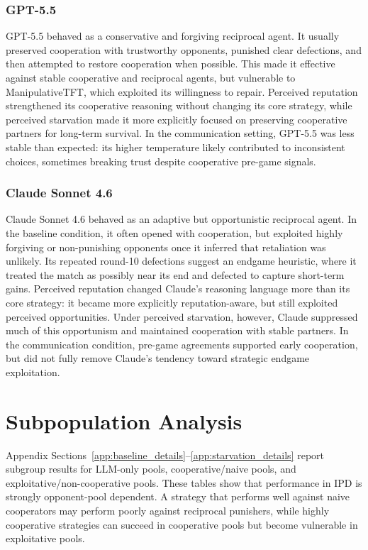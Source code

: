 \documentclass[11pt]{article}
\begin{document}
\subsubsection{GPT-5.5}

GPT-5.5 behaved as a conservative and forgiving reciprocal agent. It usually preserved cooperation with trustworthy opponents, punished clear defections, and then attempted to restore cooperation when possible. This made it effective against stable cooperative and reciprocal agents, but vulnerable to ManipulativeTFT, which exploited its willingness to repair. Perceived reputation strengthened its cooperative reasoning without changing its core strategy, while perceived starvation made it more explicitly focused on preserving cooperative partners for long-term survival. In the communication setting, GPT-5.5 was less stable than expected: its higher temperature likely contributed to inconsistent choices, sometimes breaking trust despite cooperative pre-game signals.

\subsubsection{Claude Sonnet 4.6}

Claude Sonnet 4.6 behaved as an adaptive but opportunistic reciprocal agent. In the baseline condition, it often opened with cooperation, but exploited highly forgiving or non-punishing opponents once it inferred that retaliation was unlikely. Its repeated round-10 defections suggest an endgame heuristic, where it treated the match as possibly near its end and defected to capture short-term gains. Perceived reputation changed Claude’s reasoning language more than its core strategy: it became more explicitly reputation-aware, but still exploited perceived opportunities. Under perceived starvation, however, Claude suppressed much of this opportunism and maintained cooperation with stable partners. In the communication condition, pre-game agreements supported early cooperation, but did not fully remove Claude’s tendency toward strategic endgame exploitation.




\section{Subpopulation Analysis}

Appendix Sections~\ref{app:baseline_details}--\ref{app:starvation_details} report subgroup results for LLM-only pools, cooperative/naive pools, and exploitative/non-cooperative pools. These tables show that performance in IPD is strongly opponent-pool dependent. A strategy that performs well against naive cooperators may perform poorly against reciprocal punishers, while highly cooperative strategies can succeed in cooperative pools but become vulnerable in exploitative pools.
\end{document}
